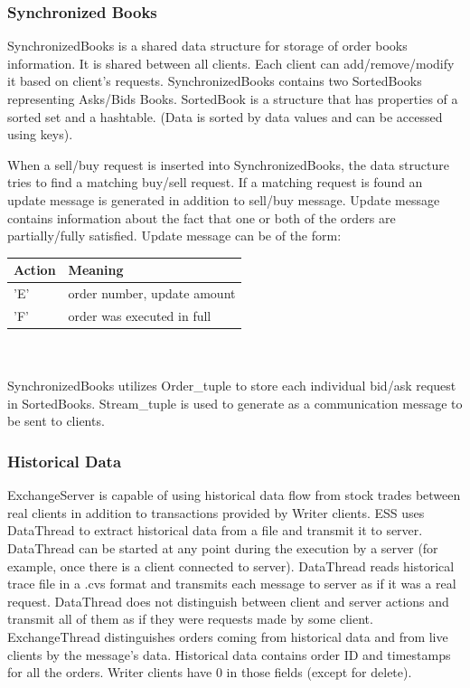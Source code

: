 \documentclass[14pt]{article}
\begin{document}
\subsubsection{Synchronized Books}
SynchronizedBooks is a shared data structure for storage of order books information. It is shared between all clients. Each client can add/remove/modify it based on client's requests. SynchronizedBooks contains two SortedBooks representing Asks/Bids Books. SortedBook is a structure that has properties of a sorted set and a hashtable. (Data is sorted by data values and can be accessed using keys).

When a sell/buy request is inserted into SynchronizedBooks, the data structure tries to find a matching buy/sell request. If a matching request is found an update message is generated in addition to sell/buy message. Update message contains information about the fact that one or both of the orders are partially/fully satisfied. Update message can be of the form:


\begin{tabular}{|l|l|}
  \hline
  Action & Meaning \\ \hline
  'E' & order number, update amount \\ \hline
  'F' & order was executed in full \\

  \hline
\end{tabular}
\\
\\
SynchronizedBooks utilizes Order\_tuple to store each individual bid/ask request in SortedBooks. Stream\_tuple is used to generate as a communication message to be sent to clients.


\subsubsection{Historical Data}

ExchangeServer is capable of using historical data flow from stock trades between real clients in addition to transactions provided by Writer clients. ESS uses DataThread to extract historical data from a file and transmit it to server. DataThread can be started at any point during the execution by a server (for example, once there is a client connected to server). DataThread reads historical trace file in a .cvs format and transmits each message to server as if it was a real request. DataThread does not distinguish between client and server actions and transmit all of them as if they were requests made by some client. ExchangeThread distinguishes orders coming from historical data and from live clients by the message's data. Historical data contains order ID and timestamps for all the orders. Writer clients have 0 in those fields (except for delete).  
\end{document}
